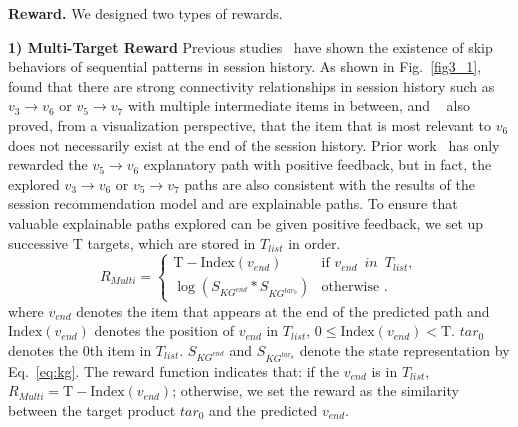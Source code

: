 \documentclass[10pt,journal,compsoc]{IEEEtran}
\begin{document}
\textbf{Reward.} We designed two types of rewards.

\textbf{1) Multi-Target Reward} \quad 
Previous studies~\cite{rs_caser,rs_narm} have shown the existence of skip behaviors of sequential patterns in session history. As shown in Fig.~\ref{fig3_1},~\cite{rs_caser} found that there are strong connectivity relationships in session history such as $v_3 \rightarrow v_6$ or $v_5 \rightarrow v_7$ with multiple intermediate items in between, and ~\cite{rs_narm} also proved, from a visualization perspective, that the item that is most relevant to $v_6$ does not necessarily exist at the end of the session history.
Prior work~\cite{rs_reks} has only rewarded the $v_5 \rightarrow v_6$ explanatory path with positive feedback, but in fact, the explored $v_3 \rightarrow v_6$ or $v_5 \rightarrow v_7$ paths are also consistent with the results of the session recommendation model and are explainable paths. To ensure that valuable explainable paths explored can be given positive feedback, we set up successive T targets, which are stored in $T_{list}$ in order. 
\begin{equation}
R_{Multi} = \begin{cases}
    \mathrm{T-Index}(v_{end}) & \text{if } v_{end}\enspace in\enspace T_{list}, \\
    \log(S_{KG^{end}}*S_{KG^{tar_0}}) & \text{otherwise }.
\end{cases}
\end{equation}
where $v_{end}$ denotes the item that appears at the end of the predicted path and $\mathrm{Index}(v_{end})$ denotes the position of $v_{end}$ in $T_{list}$, $0\leq \mathrm{Index}(v_{end})<\mathrm{T}$. $tar_0$ denotes the 0th item in $T_{list}$. $S_{KG^{end}}$ and $S_{KG^{tar_0}}$ denote the state representation by Eq.~\ref{eq:kg}. The reward function indicates that: if the $v_{end}$ is in $T_{list}$, $R_{Multi}=\mathrm{T-Index}(v_{end})$; otherwise, we set the reward as the similarity between the target product $tar_0$ and the predicted $v_{end}$.
\end{document}
